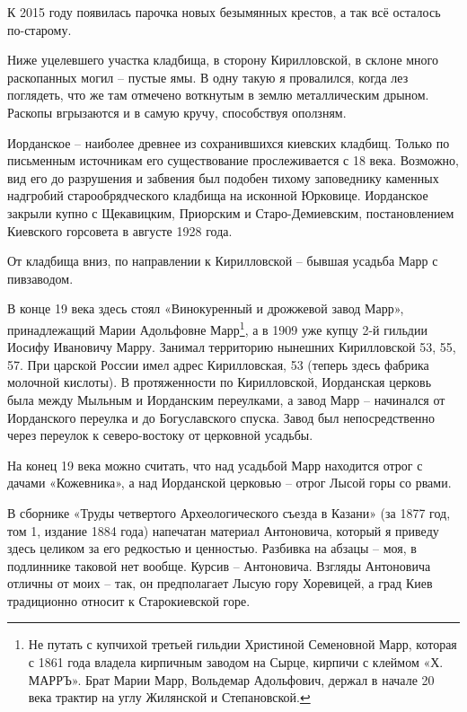 К 2015 году появилась парочка новых безымянных крестов, а так всё осталось по-старому.

Ниже уцелевшего участка кладбища, в сторону Кирилловской, в склоне много раскопанных могил – пустые ямы. В одну такую я провалился, когда лез поглядеть, что же там отмечено воткнутым в землю металлическим дрыном. Раскопы вгрызаются и в самую кручу, способствуя оползням.

Иорданское – наиболее древнее из сохранившихся киевских кладбищ. Только по письменным источникам его существование прослеживается с 18 века. Возможно, вид его до разрушения и забвения был подобен тихому заповеднику каменных надгробий старообрядческого кладбища на исконной Юрковице. Иорданское закрыли купно с Щекавицким, Приорским и Старо-Демиевским, постановлением Киевского горсовета в августе 1928 года.

От кладбища вниз, по направлении к Кирилловской – бывшая усадьба Марр с пивзаводом.

В конце 19 века здесь стоял «Винокуренный и дрожжевой завод Марр», принадлежащий Марии Адольфовне Марр\footnote{Не путать с купчихой третьей гильдии Христиной Семеновной Марр, которая с 1861 года владела кирпичным заводом на Сырце, кирпичи с клеймом «Х. МАРРЪ». Брат Марии Марр, Вольдемар Адольфович, держал в начале 20 века трактир на углу Жилянской и Степановской.}, а в 1909 уже купцу 2-й гильдии Иосифу Ивановичу Марру. Занимал территорию нынешних Кирилловской 53, 55, 57. При царской России имел адрес Кирилловская, 53 (теперь здесь фабрика молочной кислоты). В протяженности по Кирилловской, Иорданская церковь была между Мыльным и Иорданским переулками, а завод Марр – начинался от Иорданского переулка и до Богуславского спуска. Завод был непосредственно через переулок к северо-востоку от церковной усадьбы.

На конец 19 века можно считать, что над усадьбой Марр находится отрог с дачами «Кожевника», а над Иорданской церковью – отрог Лысой горы со рвами.


В сборнике «Труды четвертого Археологического съезда в Казани» (за 1877 год, том 1, издание 1884 года) напечатан материал Антоновича, который я приведу здесь целиком за его редкостью и ценностью. Разбивка на абзацы – моя, в подлиннике таковой нет вообще. Курсив – Антоновича. Взгляды Антоновича отличны от моих – так, он предполагает Лысую гору Хоревицей, а град Киев традиционно относит к Старокиевской горе. 

